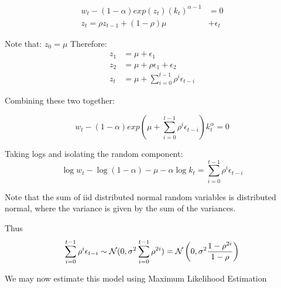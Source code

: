 \documentclass[12pt, letterpaper]{paper}
\begin{document}
\begin{align*}
  w_t - (1-\alpha) exp( z_t ) (k_t)^{\alpha-1} &= 0\\
  z_t = \rho z_{t-1} + (1-\rho)\mu &+ \epsilon_t
\end{align*}


Note that: $z_0 = \mu$ Therefore:
\begin{align*}
  z_1 &= \mu + \epsilon_1\\
  z_2 &= \mu + \rho\epsilon_1 + \epsilon_2\\
  z_t &= \mu + \sum_{i=0}^{t-1} \rho^i \epsilon_{t-i}
\end{align*}

Combining these two together:

\begin{equation*}
  w_t - (1-\alpha) exp \left( \mu + \sum_{i=0}^{t-1} \rho^i \epsilon_{t-i} \right) k_t^{\alpha} = 0
\end{equation*}

Taking logs and isolating the random component:
\begin{equation*}
  \log w_t - \log(1-\alpha) - \mu - \alpha \log k_t =  \sum_{i=0}^{t-1} \rho^i \epsilon_{t-i}
\end{equation*}

Note that the sum of iid distributed normal random variables is
distributed normal, where the variance is given by the sum of the
variances.

Thus
\begin{equation*}
  \sum_{i=0}^{t-1} \rho^i \epsilon_{t-i} \sim \mathcal{N}( 0, \sigma^2 \sum_{i=0}^{t-1} \rho^{2i}) =
  \mathcal{N}\left( 0, \sigma^2 \frac{1 - \rho^{2i}}{1-\rho}\right)
\end{equation*}

We may now estimate this model using Maximum Likelihood Estimation
\end{document}
